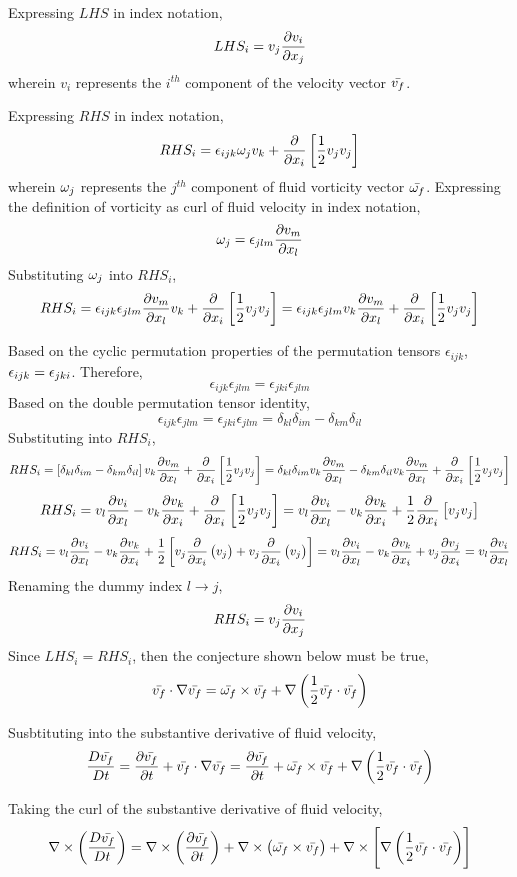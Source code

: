 \documentclass[class=report, 12pt, crop=false]{standalone}
\begin{document}
\begin{center}
Expressing $LHS$ in index notation,
$$LHS_i = v_j\frac{\partial v_i}{\partial x_j}$$
wherein $v_i$ represents the $i^{th}$ component of the velocity vector $\bar{v_f}$. 

Expressing $RHS$ in index notation,
$$RHS_i = \epsilon_{ijk} \omega_j v_k + \frac{\partial}{\partial x_i}\left[\frac{1}{2}v_jv_j\right]$$
wherein $\omega_j$ represents the $j^{th}$ component of fluid vorticity vector $\bar{\omega_f}$. Expressing the definition of vorticity as curl of fluid velocity in index notation,
$$\omega_j = \epsilon_{jlm}\frac{\partial v_m}{\partial x_l}$$
Substituting $\omega_j$ into $RHS_i$,
$$RHS_i = \epsilon_{ijk} \epsilon_{jlm}\frac{\partial v_m}{\partial x_l} v_k + \frac{\partial}{\partial x_i}\left[\frac{1}{2}v_jv_j\right] = \epsilon_{ijk} \epsilon_{jlm} v_k\frac{\partial v_m}{\partial x_l} + \frac{\partial}{\partial x_i}\left[\frac{1}{2}v_jv_j\right]$$

Based on the cyclic permutation properties of the permutation tensors $\epsilon_{ijk}$, $\displaystyle \epsilon_{ijk} = \epsilon_{jki}$. Therefore,
$$\epsilon_{ijk} \epsilon_{jlm} = \epsilon_{jki} \epsilon_{jlm}$$
Based on the double permutation tensor identity,
$$\epsilon_{ijk} \epsilon_{jlm} = \epsilon_{jki} \epsilon_{jlm} = \delta_{kl}\delta_{im} - \delta_{km}\delta_{il}$$
Substituting into $RHS_i$,
$$RHS_i = \left[\delta_{kl}\delta_{im} - \delta_{km}\delta_{il}\right]v_k\frac{\partial v_m}{\partial x_l} + \frac{\partial}{\partial x_i}\left[\frac{1}{2}v_jv_j\right] = \delta_{kl}\delta_{im}v_k\frac{\partial v_m}{\partial x_l} - \delta_{km}\delta_{il}v_k\frac{\partial v_m}{\partial x_l} + \frac{\partial}{\partial x_i}\left[\frac{1}{2}v_jv_j\right]$$
$$RHS_i = v_l\frac{\partial v_i}{\partial x_l} - v_k\frac{\partial v_k}{\partial x_i} + \frac{\partial}{\partial x_i}\left[\frac{1}{2}v_jv_j\right] = v_l\frac{\partial v_i}{\partial x_l} - v_k\frac{\partial v_k}{\partial x_i} + \frac{1}{2}\frac{\partial}{\partial x_i}\left[v_jv_j\right]$$
$$RHS_i = v_l\frac{\partial v_i}{\partial x_l} - v_k\frac{\partial v_k}{\partial x_i} + \frac{1}{2}\left[v_j\frac{\partial}{\partial x_i}\left(v_j\right) + v_j\frac{\partial}{\partial x_i}\left(v_j\right)\right] = v_l\frac{\partial v_i}{\partial x_l} - v_k\frac{\partial v_k}{\partial x_i} + v_j\frac{\partial v_j}{\partial x_i} = v_l\frac{\partial v_i}{\partial x_l}$$
Renaming the dummy index $l\to j$,
$$RHS_i = v_j\frac{\partial v_i}{\partial x_j}$$
Since $LHS_i = RHS_i$, then the conjecture shown below must be true,
$$\bar{v_f}\cdot\nabla\bar{v_f} = \bar{\omega_f}\times \bar{v_f} + \nabla\left(\frac{1}{2}\bar{v_f}\cdot\bar{v_f}\right)$$


Susbtituting into the substantive derivative of fluid velocity,
$$\frac{D \bar{v_f}}{Dt} = \frac{\partial \bar{v_f}}{\partial t} + \bar{v_f}\cdot\nabla\bar{v_f} = \frac{\partial \bar{v_f}}{\partial t} + \bar{\omega_f}\times \bar{v_f} + \nabla\left(\frac{1}{2}\bar{v_f}\cdot\bar{v_f}\right)$$

Taking the curl of the substantive derivative of fluid velocity,
$$\nabla\times\left(\frac{D \bar{v_f}}{Dt}\right) = \nabla\times\left(\frac{\partial \bar{v_f}}{\partial t}\right) + \nabla\times\left(\bar{\omega_f}\times \bar{v_f}\right) + \nabla\times\left[\nabla\left(\frac{1}{2}\bar{v_f}\cdot\bar{v_f}\right)\right]$$


\end{center}
\end{document}
